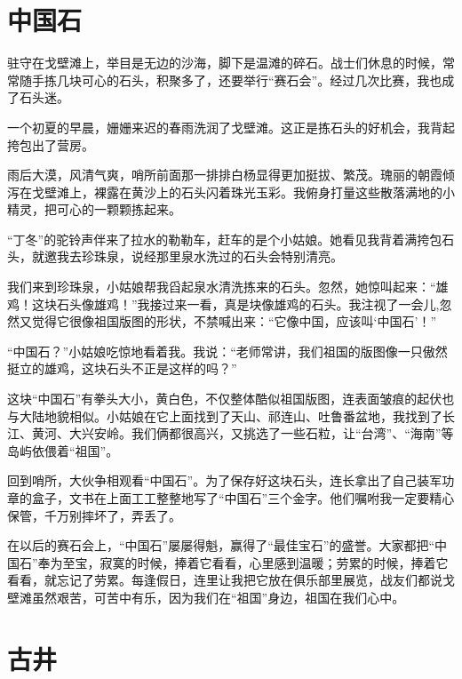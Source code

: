 \documentclass[12pt,UTF-8,openany]{ctexbook}
\begin{document}
\chapter{中国石}

\begin{Large}
    
    驻守在戈壁滩上，举目是无边的沙海，脚下是温滩的碎石。战士们休息的时候，常常随手拣几块可心的石头，积聚多了，还要举行“赛石会”。经过几次比赛，我也成了石头迷。
    
    一个初夏的早晨，姗姗来迟的春雨洗润了戈壁滩。这正是拣石头的好机会，我背起挎包出了营房。
    
    雨后大漠，风清气爽，哨所前面那一排排白杨显得更加挺拔、繁茂。瑰丽的朝霞倾泻在戈壁滩上，裸露在黄沙上的石头闪着珠光玉彩。我俯身打量这些散落满地的小精灵，把可心的一颗颗拣起来。
    
    “丁冬”的驼铃声伴来了拉水的勒勒车，赶车的是个小姑娘。她看见我背着满挎包石头，就邀我去珍珠泉，说经那里泉水洗过的石头会特别清亮。
    
    我们来到珍珠泉，小姑娘帮我舀起泉水清洗拣来的石头。忽然，她惊叫起来：“雄鸡！这块石头像雄鸡！”我接过来一看，真是块像雄鸡的石头。我注视了一会儿,忽然又觉得它很像祖国版图的形状，不禁喊出来：“它像中国，应该叫‘中国石’！”
    
    “中国石？”小姑娘吃惊地看着我。我说：“老师常讲，我们祖国的版图像一只傲然挺立的雄鸡，这块石头不正是这样的吗？”
    
    这块“中国石”有拳头大小，黄白色，不仅整体酷似祖国版图，连表面皱痕的起伏也与大陆地貌相似。小姑娘在它上面找到了天山、祁连山、吐鲁番盆地，我找到了长江、黄河、大兴安岭。我们俩都很高兴，又挑选了一些石粒，让“台湾”、“海南”等岛屿依偎着“祖国”。
    
    回到哨所，大伙争相观看“中国石”。为了保存好这块石头，连长拿出了自己装军功章的盒子，文书在上面工工整整地写了“中国石”三个金字。他们嘱咐我一定要精心保管，千万别摔坏了，弄丢了。
    
    在以后的赛石会上，“中国石”屡屡得魁，赢得了“最佳宝石”的盛誉。大家都把“中国石”奉为至宝，寂寞的时候，捧着它看看，心里感到温暖；劳累的时候，捧着它看看，就忘记了劳累。每逢假日，连里让我把它放在俱乐部里展览，战友们都说戈壁滩虽然艰苦，可苦中有乐，因为我们在“祖国”身边，祖国在我们心中。
    
\end{Large}

\chapter{古井}
\end{document}
